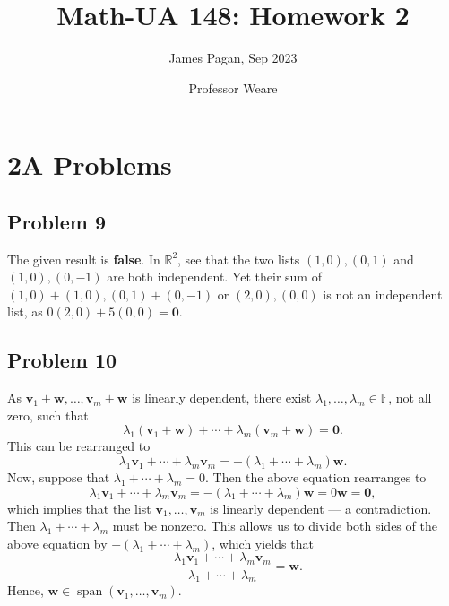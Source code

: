 \documentclass[11pt]{article}
\title{Math-UA 148: Homework 2}
\author{James Pagan, Sep 2023}
\date{Professor Weare}
\renewcommand{\vec}[1]{\mathbf{#1}}
\begin{document}
\maketitle
\tableofcontents


\section{2A Problems}


\subsection{Problem 9}

The given result is \textbf{false}. In $\mathbb{R}^{2}$, see that the two lists $(1, 0), (0, 1)$ and $(1, 0), (0, -1)$ are both independent. Yet their sum of $(1, 0) + (1, 0), (0, 1) + (0, -1)$ or $(2, 0), (0, 0)$ is not an independent list, as $0(2, 0) + 5(0, 0) = \vec{0}$. 


\subsection{Problem 10}

As $\vec{v}_{1} + \vec{w}, \ldots, \vec{v}_{m} + \vec{w}$ is linearly dependent, there exist $\lambda_{1}, \ldots, \lambda_{m} \in \mathbb{F}$, not all zero, such that
\[
	\lambda_{1} (\vec{v}_{1} + \vec{w}) + \cdots + \lambda_{m} (\vec{v}_{m} + \vec{w}) = \vec{0}.
\]
This can be rearranged to 
\[
	\lambda_{1} \vec{v}_{1} + \cdots + \lambda_{m} \vec{v}_{m} = -(\lambda_{1} + \cdots + \lambda_{m}) \vec{w}.
\]
Now, suppose that $\lambda_{1} + \cdots + \lambda_{m} = 0$. Then the above equation rearranges to
\[
	\lambda_{1} \vec{v}_{1} + \cdots + \lambda_{m} \vec{v}_{m} = -(\lambda_{1} + \cdots + \lambda_{m}) \vec{w} = 0 \vec{w} = \vec{0},
\]
which implies that the list $\vec{v}_{1}, \ldots, \vec{v}_{m}$ is linearly dependent --- a contradiction. Then $\lambda_{1} + \cdots + \lambda_{m}$ must be nonzero. This allows us to divide both sides of the above equation by $-(\lambda_{1} + \cdots + \lambda_{m})$, which yields that
\[
	- \frac{\lambda_{1} \vec{v}_{1} + \cdots + \lambda_{m} \vec{v}_{m}}{\lambda_{1} + \cdots + \lambda_{m}} = \vec{w}.
\]
Hence, $\vec{w} \in \operatorname{span} (\vec{v}_{1}, \ldots, \vec{v}_{m})$.
\end{document}
